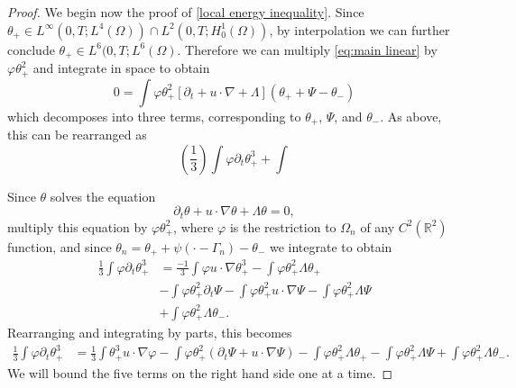 \documentclass[11pt]{amsart}
\theoremstyle{remark}
\theoremstyle{definition}
\newcommand{\R}{\mathbb{R}}
\newcommand{\paren}[1]{\left( #1 \right)}
\newcommand{\bracket}[1]{\left[ #1 \right]}
\newcommand{\del}{\partial}
\newcommand{\grad}{\nabla}
\newcommand{\ulow}{u_\ell}
\newcommand{\uhigh}{u_h}
\begin{document}
\begin{proof}
We begin now the proof of \eqref{local energy inequality}.  Since $\theta_+ \in L^\infty(0,T; L^4(\Omega)) \cap L^2(0,T; H_0^1(\Omega))$, by interpolation we can further conclude $\theta_+ \in L^6(0,T; L^6(\Omega)$.  Therefore we can multiply \eqref{eq:main linear} by $\varphi \theta_+^2$ and integrate in space to obtain
\[ 0 = \int \varphi \theta_+^2 \bracket{ \del_t + u \cdot \grad + \Lambda } \paren{\theta_+ + \Psi - \theta_-} \]
which decomposes into three terms, corresponding to $\theta_+$, $\Psi$, and $\theta_-$.  As above, this can be rearranged as
\[ \paren{\frac{1}{3}} \int \varphi \del_t \theta_+^3 + \int \]

Since $\theta$ solves the equation
\[ \del_t \theta + u\cdot \grad \theta + \Lambda \theta = 0, \] 
multiply this equation by $\varphi \theta_+^2$, where $\varphi$ is the restriction to $\Omega_n$ of any $C^2(\R^2)$ function, and since $\theta_n = \theta_+ + \psi(\cdot-\Gamma_n) - \theta_-$ we integrate to obtain
\begin{align*} 
\frac{1}{3} \int \varphi \del_t \theta_+^3 &= \frac{-1}{3} \int \varphi u \cdot \grad \theta_+^3 - \int \varphi \theta_+^2 \Lambda \theta_+ 
\\ & - \int \varphi \theta_+^2 \del_t \Psi  - \int \varphi \theta_+^2 u \cdot \grad \Psi 
 - \int \varphi \theta_+^2 \Lambda \Psi 
\\ & + \int \varphi \theta_+^2 \Lambda \theta_-. 
\end{align*}
Rearranging and integrating by parts, this becomes
\begin{align*} 
\frac{1}{3} \int \varphi \del_t \theta_+^3 &= \frac{1}{3} \int  \theta_+^3 u \cdot \grad \varphi - \int \varphi \theta_+^2 \paren{\del_t \Psi + u \cdot \grad \Psi} 
- \int \varphi \theta_+^2 \Lambda \theta_+ - \int \varphi \theta_+^2 \Lambda \Psi + \int \varphi \theta_+^2 \Lambda \theta_-. 
\end{align*}
We will bound the five terms on the right hand side one at a time.  


\end{proof}
\end{document}
